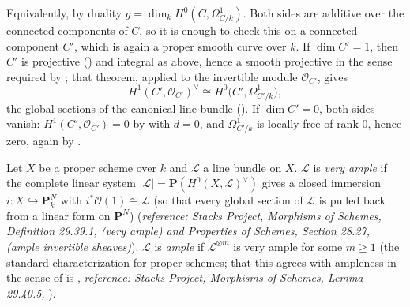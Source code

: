\begin{definition}
Equivalently, by duality \(g=\dim_kH^0(C,\Omega^1_{C/k})\).  Both
sides are additive over the connected components of \(C\), so it is
enough to check this on a connected component \(C'\), which is again a
proper smooth curve over \(k\).  If \(\dim C'=1\), then \(C'\) is
projective () and integral as
above, hence a smooth projective  in the
sense required by ; that theorem,
applied to the invertible module \(\mathcal O_{C'}\), gives
\[
 H^1(C',\mathcal O_{C'})^{\vee}\cong
 H^0\bigl(C',\Omega^1_{C'/k}\bigr),
\]
the global sections of the canonical line bundle
().  If \(\dim C'=0\), both sides
vanish: \(H^1(C',\mathcal O_{C'})=0\) by
 with \(d=0\), and
\(\Omega^1_{C'/k}\) is locally free of rank \(0\), hence zero, again
by .
\end{definition}

\begin{definition}
\label{def:pcb-ample}
Let \(X\) be a proper scheme over \(k\) and \(\mathcal L\) a line
bundle on \(X\).  \(\mathcal L\) is \emph{very ample} if the complete
linear system \(|\mathcal L|=\mathbf P(H^0(X,\mathcal L)^{\vee})\)
gives a closed immersion \(i:X\hookrightarrow\mathbf P^N_k\) with
\(i^*\mathcal O(1)\cong\mathcal L\) (so that every global section of
\(\mathcal L\) is pulled back from a linear form on \(\mathbf P^N\))
(\emph{reference: Stacks Project, Morphisms of Schemes, Definition
29.39.1,  (very ample) and Properties of Schemes, Section
28.27,  (ample invertible sheaves)}).  \(\mathcal L\) is
\emph{ample} if
\(\mathcal L^{\otimes m}\) is very ample for some \(m\geq1\) (the
standard characterization for proper schemes; that this agrees with
ampleness in the sense of  is
, \emph{reference: Stacks
Project, Morphisms of Schemes, Lemma 29.40.5, 
}).
\end{definition}

